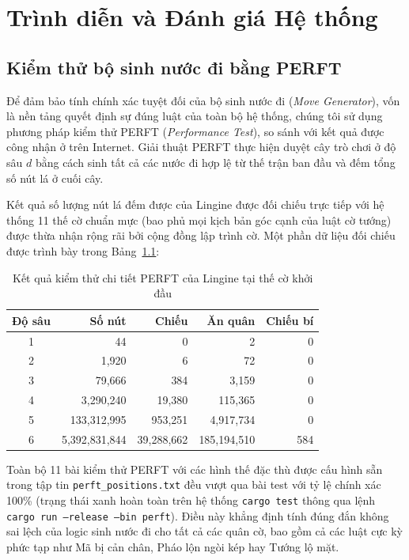 \chapter{Trình diễn và Đánh giá Hệ thống}

\section{Kiểm thử bộ sinh nước đi bằng PERFT}

Để đảm bảo tính chính xác tuyệt đối của bộ sinh nước đi (\textit{Move Generator}), vốn là nền tảng quyết định sự đúng luật của toàn bộ hệ thống, chúng tôi sử dụng phương pháp kiểm thử PERFT (\textit{Performance Test}), so sánh với kết quả được công nhận ở trên Internet. Giải thuật PERFT thực hiện duyệt cây trò chơi ở độ sâu $d$ bằng cách sinh tất cả các nước đi hợp lệ từ thế trận ban đầu và đếm tổng số nút lá ở cuối cây.

Kết quả số lượng nút lá đếm được của Lingine được đối chiếu trực tiếp với hệ thống 11 thế cờ chuẩn mực (bao phủ mọi kịch bản góc cạnh của luật cờ tướng) được thừa nhận rộng rãi bởi cộng đồng lập trình cờ. Một phần dữ liệu đối chiếu được trình bày trong Bảng~\ref{tab:perft_results}:

\begin{table}[htbp]
    \centering
    \begin{tabular}{crrrr}
        \toprule
        \textbf{Độ sâu} & \textbf{Số nút} & \textbf{Chiếu} & \textbf{Ăn quân} & \textbf{Chiếu bí} \\
        \midrule
        1 & 44 & 0 & 2 & 0 \\
        2 & 1,920 & 6 & 72 & 0 \\
        3 & 79,666 & 384 & 3,159 & 0 \\
        4 & 3,290,240 & 19,380 & 115,365 & 0 \\
        5 & 133,312,995 & 953,251 & 4,917,734 & 0 \\
        6 & 5,392,831,844 & 39,288,662 & 185,194,510 & 584 \\
        \bottomrule
    \end{tabular}
    \caption{Kết quả kiểm thử chi tiết PERFT của Lingine tại thế cờ khởi đầu}
    \label{tab:perft_results}
\end{table}

Toàn bộ 11 bài kiểm thử PERFT với các hình thế đặc thù được cấu hình sẵn trong tập tin \texttt{perft\_positions.txt} đều vượt qua bài test với tỷ lệ chính xác 100\% (trạng thái xanh hoàn toàn trên hệ thống \texttt{cargo test} thông qua lệnh \texttt{cargo run --release --bin perft}). Điều này khẳng định tính đúng đắn không sai lệch của logic sinh nước đi cho tất cả các quân cờ, bao gồm cả các luật cực kỳ phức tạp như Mã bị cản chân, Pháo lộn ngòi kép hay Tướng lộ mặt.

